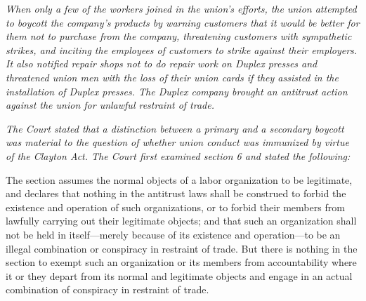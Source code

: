 \documentclass[
  letterpaper,
  11pt,
  DIV=9,
  openright]{scrbook}
\renewenvironment{quote}{
  \list{}{\leftmargin=2em\rightmargin=2em}
  \item\relax\small
}
{\endlist}
\begin{document}
\begin{quote}
\emph{When only a few of the workers joined in the union's efforts, the
union attempted to boycott the company's products by warning customers
that it would be better for them not to purchase from the company,
threatening customers with sympathetic strikes, and inciting the
employees of customers to strike against their employers. It also
notified repair shops not to do repair work on Duplex presses and
threatened union men with the loss of their union cards if they assisted
in the installation of Duplex presses. The Duplex company brought an
antitrust action against the union for unlawful restraint of trade.}

\emph{The Court stated that a distinction between a primary and a
secondary boycott was material to the question of whether union conduct
was immunized by virtue of the Clayton Act. The Court first examined
section 6 and stated the following:}

\begin{quote}
The section assumes the normal objects of a labor organization to be
legitimate, and declares that nothing in the antitrust laws shall be
construed to forbid the existence and operation of such organizations,
or to forbid their members from lawfully carrying out their legitimate
objects; and that such an organization shall not be held in
itself---merely because of its existence and operation---to be an
illegal combination or conspiracy in restraint of trade. But there is
nothing in the section to exempt such an organization or its members
from accountability where it or they depart from its normal and
legitimate objects and engage in an actual combination of conspiracy in
restraint of trade.
\end{quote}


\end{quote}
\end{document}
